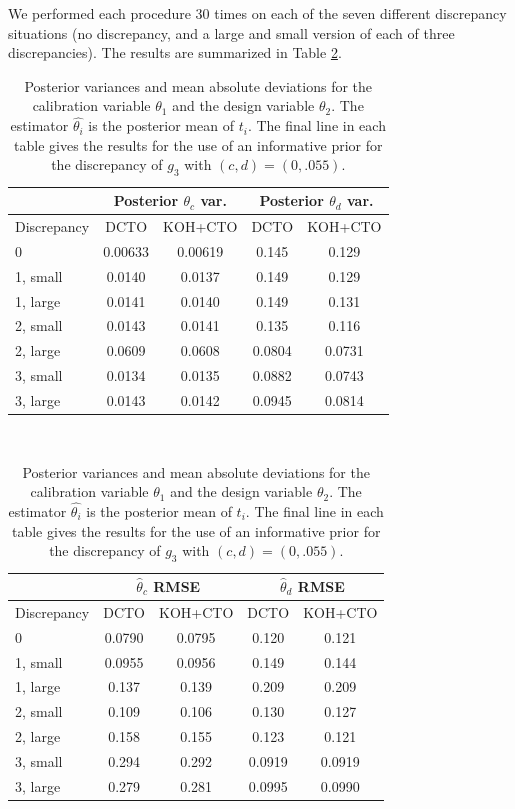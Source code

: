 \documentclass[12pt]{article}
\begin{document}
%
We performed each procedure 30 times on each of the seven different discrepancy situations (no discrepancy, and a large and small version of each of three discrepancies).
%
The results are summarized in Table \ref{table:vars_and_rmses}.
%
\begin{table}[]
	\centering
	\begin{tabular}{l|cc|cc}
		&\multicolumn{2}{c|}{Posterior $\theta_c$ var.}&
		\multicolumn{2}{c}{Posterior $\theta_d$ var.} \\ \hline
		Discrepancy    & DCTO   & KOH+CTO & DCTO    & KOH+CTO   \\ \hline
		0              & 0.00633 & 0.00619 & 0.145 & 0.129\\ \hline
		1, small       & 0.0140 & 0.0137 & 0.149 & 0.129\\ \hline
		1, large       & 0.0141 & 0.0140 & 0.149 & 0.131\\ \hline
		2, small       & 0.0143 & 0.0141 & 0.135 & 0.116\\ \hline
		2, large       & 0.0609 & 0.0608 & 0.0804 & 0.0731\\ \hline
		3, small       & 0.0134 & 0.0135 & 0.0882 & 0.0743\\ \hline
		3, large       & 0.0143 & 0.0142 & 0.0945 & 0.0814\\ \hline
	\end{tabular}\\
	\vspace{.25in}
	\begin{tabular}{l|cc|cc}
		&\multicolumn{2}{c|}{$\widehat\theta_c$ RMSE}&
		\multicolumn{2}{c}{$\widehat\theta_d$ RMSE} \\ \hline
		Discrepancy    & DCTO   & KOH+CTO & DCTO    & KOH+CTO   \\ \hline
		0              & 0.0790 & 0.0795 & 0.120 & 0.121\\ \hline
		1, small       & 0.0955 & 0.0956 & 0.149 & 0.144\\ \hline
		1, large       & 0.137 & 0.139 & 0.209 & 0.209\\ \hline
		2, small       & 0.109 & 0.106 & 0.130 & 0.127\\ \hline
		2, large       & 0.158 & 0.155 & 0.123 & 0.121\\ \hline
		3, small       & 0.294 & 0.292 & 0.0919 & 0.0919\\ \hline
		3, large       & 0.279 & 0.281 & 0.0995 & 0.0990\\ \hline
	\end{tabular}
	\caption{Posterior variances and mean absolute deviations for the calibration variable $\theta_1$ and the design variable $\theta_2$. The estimator $\widehat{\theta_i}$ is the posterior mean of $t_i$. The final line in each table gives the results for the use of an informative prior for the discrepancy of $g_3$ with $(c,d)=(0,.055)$.} 
	\label{table:vars_and_rmses}
\end{table}
\end{document}

